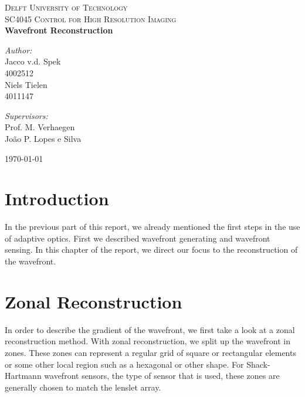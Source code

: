 \documentclass{article}
\begin{document}
\begin{titlepage}
\begin{center}

\textsc{\LARGE Delft University of Technology}\\[1.5cm]
\textsc{ SC4045 Control for High Resolution Imaging}\\[0.5cm]

{\huge\bfseries Wavefront Reconstruction \\[0.4cm] }

\begin{minipage}{0.4\textwidth}
\begin{flushleft} \large
\emph{Author:}\\
Jacco v.d. Spek \\
4002512 \\
Niels Tielen \\
4011147

\end{flushleft}
\end{minipage}
\begin{minipage}{0.4\textwidth}
\begin{flushright} \large
\emph{Supervisors:} \\
Prof. M. Verhaegen \\
João P. Lopes e Silva  
\end{flushright}
\end{minipage}

\vfill
{\large \today}
\end{center}
\end{titlepage}

\section*{Introduction}

In the previous part of this report, we already mentioned the first steps in the use of adaptive optics. First we described wavefront generating and wavefront sensing. In this chapter of the report, we direct our focus to the reconstruction of the wavefront. 

\section{Zonal Reconstruction}
In order to describe the gradient of the wavefront, we first take a look at a zonal reconstruction method. With zonal reconstruction, we split up the wavefront in zones. These zones can represent a regular grid of square or rectangular elements or some other local region such as a hexagonal or other shape. For Shack-Hartmann wavefront sensors, the type of sensor that is used, these zones are generally chosen to match the lenslet array.
\end{document}
